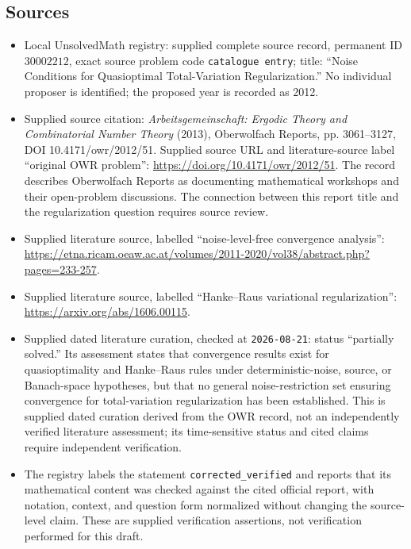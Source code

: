 \documentclass[11pt]{article}
\begin{document}
\subsection{Sources}
\begin{itemize}
\item Local UnsolvedMath registry: supplied complete source record, permanent ID \(30002212\), exact source problem code \texttt{catalogue entry}; title: ``Noise Conditions for Quasioptimal Total-Variation Regularization.'' No individual proposer is identified; the proposed year is recorded as 2012.
\item Supplied source citation: \emph{Arbeitsgemeinschaft: Ergodic Theory and Combinatorial Number Theory} (2013), Oberwolfach Reports, pp. 3061--3127, DOI 10.4171/owr/2012/51. Supplied source URL and literature-source label ``original OWR problem'': \url{https://doi.org/10.4171/owr/2012/51}. The record describes Oberwolfach Reports as documenting mathematical workshops and their open-problem discussions. The connection between this report title and the regularization question requires source review.
\item Supplied literature source, labelled ``noise-level-free convergence analysis'': \url{https://etna.ricam.oeaw.ac.at/volumes/2011-2020/vol38/abstract.php?pages=233-257}.
\item Supplied literature source, labelled ``Hanke--Raus variational regularization'': \url{https://arxiv.org/abs/1606.00115}.
\item Supplied dated literature curation, checked at \texttt{2026-08-21}: status ``partially solved.'' Its assessment states that convergence results exist for quasioptimality and Hanke--Raus rules under deterministic-noise, source, or Banach-space hypotheses, but that no general noise-restriction set ensuring convergence for total-variation regularization has been established. This is supplied dated curation derived from the OWR record, not an independently verified literature assessment; its time-sensitive status and cited claims require independent verification.
\item The registry labels the statement \texttt{corrected\_verified} and reports that its mathematical content was checked against the cited official report, with notation, context, and question form normalized without changing the source-level claim. These are supplied verification assertions, not verification performed for this draft.
\end{itemize}
\end{document}
